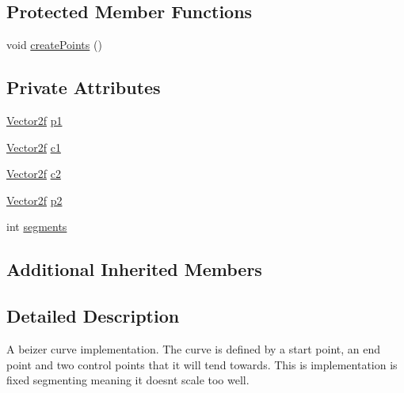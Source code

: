 \subsection*{Protected Member Functions}
\begin{DoxyCompactItemize}
\item 
void \mbox{\hyperlink{classorg_1_1newdawn_1_1slick_1_1geom_1_1_curve_a7dceb40e39184563c79b0767d8466bda}{create\+Points}} ()
\end{DoxyCompactItemize}
\subsection*{Private Attributes}
\begin{DoxyCompactItemize}
\item 
\mbox{\hyperlink{classorg_1_1newdawn_1_1slick_1_1geom_1_1_vector2f}{Vector2f}} \mbox{\hyperlink{classorg_1_1newdawn_1_1slick_1_1geom_1_1_curve_adb4d7ee49a8465099730d207e1edcdb9}{p1}}
\item 
\mbox{\hyperlink{classorg_1_1newdawn_1_1slick_1_1geom_1_1_vector2f}{Vector2f}} \mbox{\hyperlink{classorg_1_1newdawn_1_1slick_1_1geom_1_1_curve_aabfe639054bf41d5e2293bfa0190425b}{c1}}
\item 
\mbox{\hyperlink{classorg_1_1newdawn_1_1slick_1_1geom_1_1_vector2f}{Vector2f}} \mbox{\hyperlink{classorg_1_1newdawn_1_1slick_1_1geom_1_1_curve_a7bfa1bc4b7842bd895dcd43300b9b7f7}{c2}}
\item 
\mbox{\hyperlink{classorg_1_1newdawn_1_1slick_1_1geom_1_1_vector2f}{Vector2f}} \mbox{\hyperlink{classorg_1_1newdawn_1_1slick_1_1geom_1_1_curve_a5ab730c076aab007199aa4555949fa02}{p2}}
\item 
int \mbox{\hyperlink{classorg_1_1newdawn_1_1slick_1_1geom_1_1_curve_aafd4d13898e228efd7a871e5755bfb02}{segments}}
\end{DoxyCompactItemize}
\subsection*{Additional Inherited Members}


\subsection{Detailed Description}
A beizer curve implementation. The curve is defined by a start point, an end point and two control points that it will tend towards. This is implementation is fixed segmenting meaning it doesn\textquotesingle{}t scale too well.

